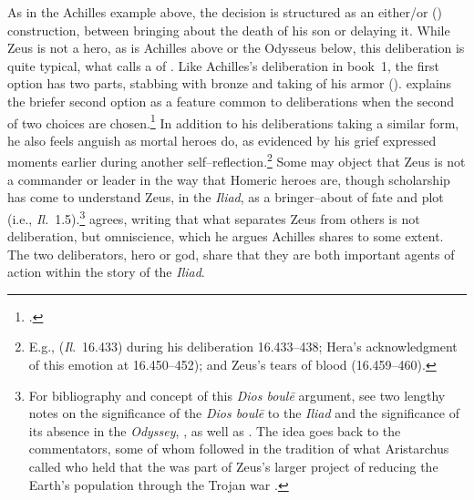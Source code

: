 \documentclass[12pt,letterpaper,oneside,final]{memoir}
\begin{document}
\begin{greek}
\begin{enumerate}
\end{enumerate} \DoubleSpacing \end{greek} As in the Achilles example above, the decision is structured as an either/or () construction, between bringing about the death of his son or delaying it. While Zeus is not a hero, as is Achilles above or the Odysseus below, this deliberation is quite typical, what \textcite[393]{janko1992} calls a  of . Like Achilles's deliberation in book~1, the first option has two parts, stabbing with bronze and taking of his armor (). \textcite[393]{janko1992} explains the briefer second option as a feature common to deliberations when the second of two choices are chosen.\footnote{.} In addition to his deliberations taking a similar form, he also feels anguish as mortal heroes do, as evidenced by his grief expressed moments earlier during another self--reflection.\footnote{E.g.,  (\emph{Il}.~16.433) during his deliberation 16.433--438; Hera's acknowledgment of this emotion at 16.450--452); and Zeus's tears of blood (16.459--460).} Some may object that Zeus is not a commander or leader in the way that Homeric heroes are, though scholarship has come to understand Zeus, in the \emph{Iliad}, as a bringer--about of fate and plot (i.e.,  \emph{Il.}~1.5).\footnote{For bibliography and concept of this \emph{Dios boulē} argument, see two lengthy notes on the significance of the \emph{Dios boulē} to the \emph{Iliad} and the significance of its absence in the \emph{Odyssey}, \textcite[pp.~19--20, nn. 19--20]{pucci1998}, as well as \textcite[pp.~271--272, n.~9]{redfield1994}. The idea goes back to the commentators, some of whom followed in the tradition of what Aristarchus called  who held that the  was part of Zeus's larger project of reducing the Earth's population through the Trojan war \parencite[this expression being analogous to \emph{Kypria} fr. 1,][p.~53]{kirk1985}.} \textcite[23]{scully1984} agrees, writing that what separates Zeus from others is not deliberation, but omniscience, which he argues Achilles shares to some extent. The two deliberators, hero or god, share that they are both important agents of action within the story of the \emph{Iliad}.
\end{document}
